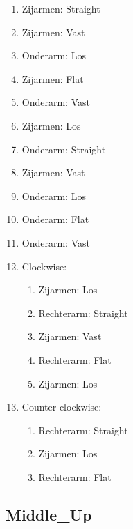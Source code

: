 \begin{enumerate}
	\item Zijarmen: Straight
	\item Zijarmen: Vast
	\item Onderarm: Los
	\item Zijarmen: Flat
	\item Onderarm: Vast
	\item Zijarmen: Los
	\item Onderarm: Straight
	\item Zijarmen: Vast
	\item Onderarm: Los
	\item Onderarm: Flat
	\item Onderarm: Vast
	\item Clockwise:
	\begin{enumerate}
		\item Zijarmen: Los
		\item Rechterarm: Straight
		\item Zijarmen: Vast
		\item Rechterarm: Flat
		\item Zijarmen: Los
	\end{enumerate}
	\item Counter clockwise:
	\begin{enumerate}
		\item Rechterarm: Straight
		\item Zijarmen: Los
		\item Rechterarm: Flat
	\end{enumerate}
\end{enumerate}
\newpage

\subsection{Middle\_Up}

